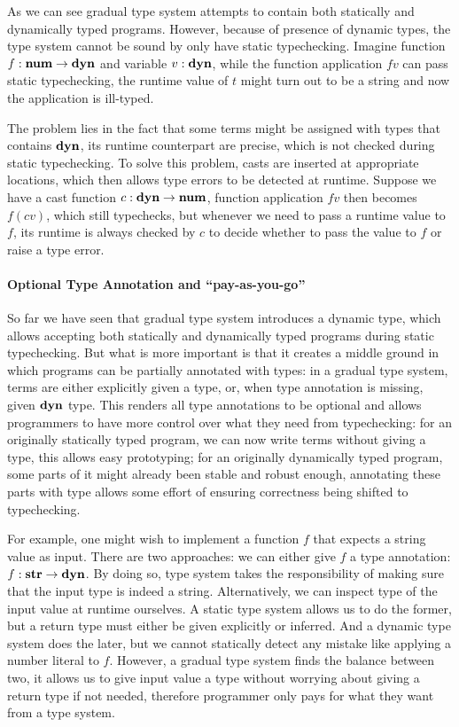 As we can see gradual type system attempts to contain both statically and dynamically typed programs.
However, because of presence of dynamic types,
the type system cannot be sound by only have static typechecking.
Imagine function $f : \textbf{num} \rightarrow \textbf{dyn}$ and variable $v : \textbf{dyn}$, while the function application
$f v$ can pass static typechecking, the runtime value of $t$ might turn out to be a string
and now the application is ill-typed.

The problem lies in the fact that some terms might be assigned with types that contains
$\textbf{dyn}$, its runtime counterpart are precise, which is not checked during static typechecking.
To solve this problem, casts are inserted at appropriate locations, which then
allows type errors to be detected at runtime.
Suppose we have a cast function $c : \textbf{dyn} \rightarrow \textbf{num}$, function application $f v$
then becomes $f (c v)$, which still typechecks, but whenever we need to pass a runtime value to $f$,
its runtime is always checked by $c$ to decide whether to pass the value to $f$ or raise
a type error.

\paragraph{Optional Type Annotation and ``pay-as-you-go''}

So far we have seen that gradual type system introduces a dynamic type,
which allows accepting both statically and dynamically typed programs during static typechecking.
But what is more important is that it creates a middle ground in which programs
can be partially annotated with types:
in a gradual type system, terms are either explicitly given a type,
or, when type annotation is missing, given $\textbf{dyn}$ type.
This renders all type annotations to be optional and allows programmers
to have more control over what they need from typechecking:
for an originally statically typed program, we can now write terms without giving a type,
this allows easy prototyping; for an originally dynamically typed program,
some parts of it might already been stable and robust enough, annotating these parts
with type allows some effort of ensuring correctness being shifted to typechecking.

For example, one might wish to implement a function $f$ that expects a string value
as input. There are two approaches: we can either give $f$ a type annotation:
$f : \textbf{str} \rightarrow \textbf{dyn}$. By doing so, type system takes the responsibility
of making sure that the input type is indeed a string. Alternatively,
we can inspect type of the input value at runtime ourselves.
A static type system allows us to do the former, but a return type must either
be given explicitly or inferred. And a dynamic type system does the later, but
we cannot statically detect any mistake like applying a number literal to $f$.
However, a gradual type system finds the balance between two,
it allows us to give input value a type without worrying about
giving a return type if not needed,
therefore programmer only pays for what they want from a type system.

